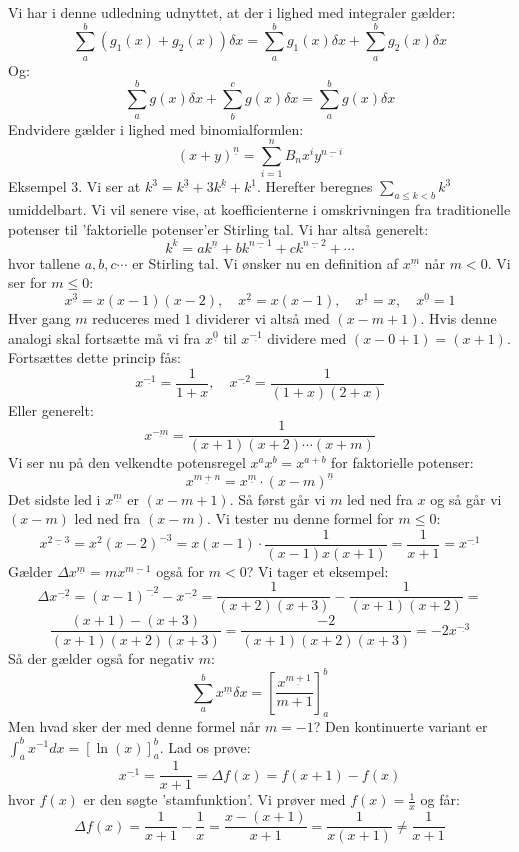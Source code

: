 Vi har i denne udledning  udnyttet, at der i lighed med integraler gælder:
\[\sum_{a}^{b}(g_{1}(x)+g_{2}(x))\delta x=\sum_{a}^{b}g_{1}(x)\delta x+\sum_{a}^{b}g_{2}(x)\delta x\]
Og:
\[\sum_{a}^{b}g(x)\delta x+\sum_{b}^{c}g(x)\delta x=\sum_{a}^{b}g(x)\delta x\]
Endvidere gælder i lighed med binomialformlen:
\[(x+y)^{\underline{n}}=\sum_{i=1}^{n}B_{n}x^{i}y^{\underline{n-i}}\]
Eksempel 3. Vi ser at \(k^{3}=k^{\underline{3}}+3k^{\underline{k}}+k^{\underline{1}}\). Herefter beregnes \(\sum_{a \leq k < b}k^{3}\) umiddelbart. Vi vil senere vise, at koefficienterne i omskrivningen fra  traditionelle potenser til 'faktorielle potenser'er Stirling tal. Vi har altså generelt:
\[k^{k}=ak^{\underline{n}}+bk^{\underline{n-1}}+ck^{\underline{n-2}}+\dotsm\]
hvor tallene \(a,b,c \dotsm\) er Stirling tal.
Vi ønsker nu en definition af \(x^{\underline{m}}\) når \(m<0\). Vi ser for \(m \leq 0\):
\[x^{\underline{3}}=x(x-1)(x-2), \quad x^{\underline{2}}=x(x-1), \quad x^{\underline{1}}=x, \quad x^{\underline{0}}=1\]
Hver gang \(m\) reduceres med \(1\) dividerer vi altså med \( (x-m+1)\). Hvis denne analogi skal fortsætte må vi fra \(x^{\underline{0}}\) til \(x^{\underline{-1}}\) dividere med \( (x-0+1)=(x+1)\). Fortsættes dette princip fås:
\[x^{\underline{-1}}=\frac{1}{1+x}, \quad x^{\underline{-2}}=\frac{1}{(1+x)(2+x)}\]
Eller generelt:
\[x^{\underline{-m}}=\frac{1}{(x+1)(x+2) \dotsm (x+m)}\]
Vi ser nu på den velkendte potensregel \(x^{a}x^{b}=x^{a+b}\) for faktorielle potenser:
\[x^{\underline{m+n}}=x^{\underline{m}} \cdot (x-m)^{\underline{n}}\]
Det sidste led i \(x^{\underline{m}}\) er \( (x-m+1)\). Så først går vi \(m\) led ned fra \(x\) og så går vi \( (x-m)\) led ned fra \( (x-m)\). Vi tester nu denne formel for \(m \leq 0\):
\[x^{\underline{2-3}}=x^{2}(x-2)^{\underline{-3}}=x(x-1) \cdot \frac{1}{(x-1)x(x+1)}=\frac{1}{x+1}=x^{\underline{-1}}\]
Gælder \(\Delta x^{\underline{m}}=mx^{\underline{m-1}}\) også for \(m<0\)? Vi tager et eksempel:
\[\Delta x^{\underline{-2}}= (x-1)^{\underline{-2}}- x^{\underline{-2}}=\frac{1}{(x+2)(x+3)}-\frac{1}{(x+1)(x+2)}=\]
\[\frac{(x+1)-(x+3)}{(x+1)(x+2)(x+3)}=\frac{-2}{(x+1)(x+2)(x+3)}=-2x^{\underline{-3}}\]
Så der gælder også for negativ \(m\):
\[\sum_{a}^{b}x^{\underline{m}} \delta x=\left[\frac{x^{\underline{m+1}}}{m+1}\right]_{a}^{b}\]
Men hvad sker der med denne formel når \(m=-1\)? Den kontinuerte variant er \(\int_{a}^{b}x^{-1}dx = [ \ln(x) ]_{a}^{b}\). Lad os prøve:
\[x^{\underline{-1}}=\frac{1}{x+1}=\Delta f(x) =f(x+1)-f(x)\]
hvor \(f(x)\) er den søgte 'stamfunktion'. Vi prøver med \(f(x)=\frac{1}{x}\) og får:
\[\Delta f(x)=\frac{1}{x+1}-\frac{1}{x}=\frac{x-(x+1)}{x+1}=\frac{1}{x(x+1)} \neq \frac{1}{x+1}\]
